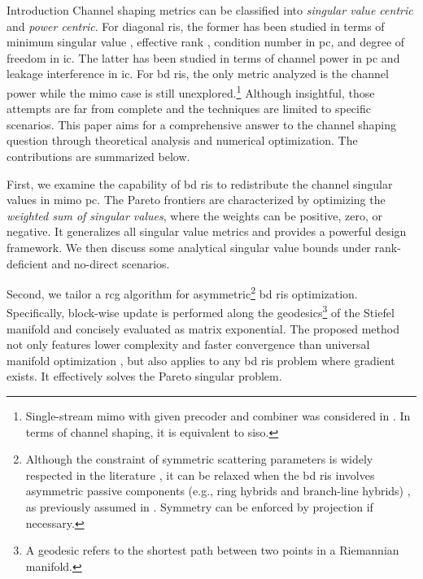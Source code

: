\documentclass[journal]{IEEEtran}
\begin{document}
\begin{section}{Introduction}
	Channel shaping metrics can be classified into \emph{singular value centric} and \emph{power centric}.
	For diagonal \gls{ris}, the former has been studied in terms of minimum singular value \cite{ElMossallamy2021}, effective rank \cite{ElMossallamy2021,Meng2023}, condition number \cite{Zheng2022,Huang2023} in \gls{pc}, and degree of freedom \cite{Bafghi2022,Zheng2023,Chae2023} in \gls{ic}.
	The latter has been studied in terms of channel power \cite{Wu2019} in \gls{pc} and leakage interference \cite{Santamaria2023a} in \gls{ic}.
	For \gls{bd} \gls{ris}, the only metric analyzed is the channel power \cite{Nerini2023,Santamaria2023} while the \gls{mimo} case is still unexplored.\footnote{Single-stream \gls{mimo} with given precoder and combiner was considered in \cite{Nerini2023}. In terms of channel shaping, it is equivalent to \gls{siso}.}
	Although insightful, those attempts are far from complete and the techniques are limited to specific scenarios.
	This paper aims for a comprehensive answer to the channel shaping question through theoretical analysis and numerical optimization.
	The contributions are summarized below.

	First, we examine the capability of \gls{bd} \gls{ris} to redistribute the channel singular values in \gls{mimo} \gls{pc}.
	The Pareto frontiers are characterized by optimizing the \emph{weighted sum of singular values}, where the weights can be positive, zero, or negative.
	It generalizes all singular value metrics and provides a powerful design framework.
	We then discuss some analytical singular value bounds under rank-deficient and no-direct scenarios.


	Second, we tailor a \gls{rcg} algorithm for asymmetric\footnote{Although the constraint of symmetric scattering parameters is widely respected in the literature \cite{Shen2020a,Nerini2023,Santamaria2023,Fang2023,Nerini2023a,Zhou2023,Li2023d,Bartoli2023}, it can be relaxed when the \gls{bd} \gls{ris} involves asymmetric passive components (e.g., ring hybrids and branch-line hybrids) \cite{Ahn2006}, as previously assumed in \cite{Li2023b,Li2023c}. Symmetry can be enforced by projection if necessary.} \gls{bd} \gls{ris} optimization.
	Specifically, block-wise update is performed along the geodesics\footnote{A geodesic refers to the shortest path between two points in a Riemannian manifold.} of the Stiefel manifold and concisely evaluated as matrix exponential.
	The proposed method not only features lower complexity and faster convergence than universal manifold optimization \cite{Absil2009,Pan2022d}, but also applies to any \gls{bd} \gls{ris} problem where gradient exists.
	It effectively solves the Pareto singular problem.


\end{section}
\end{document}
